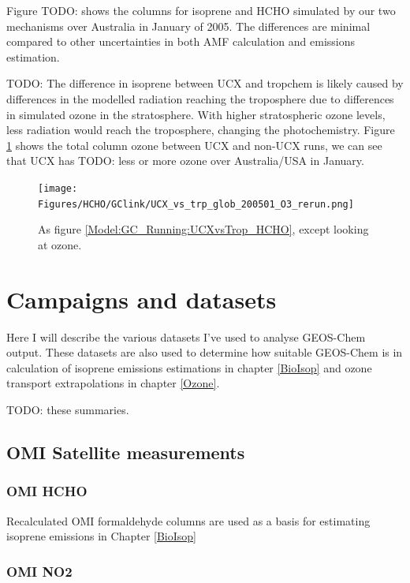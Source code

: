     
    Figure TODO: shows the columns for isoprene and HCHO simulated by our two mechanisms over Australia in January of 2005.
    The differences are minimal compared to other uncertainties in both AMF calculation and emissions estimation.
    
    
    TODO: The difference in isoprene between UCX and tropchem is likely caused by differences in the modelled radiation reaching the troposphere due to differences in simulated ozone in the stratosphere.
    With higher stratospheric ozone levels, less radiation would reach the troposphere, changing the photochemistry.
    Figure \ref{Model:GC_Running:UCXvsTrop_O3} shows the total column ozone between UCX and non-UCX runs, we can see that UCX has TODO: less or more ozone over Australia/USA in January.
        
    \begin{figure}%
      \texttt{[image: Figures/HCHO/GClink/UCX\_vs\_trp\_glob\_200501\_O3\_rerun.png]}
      \caption{%
        As figure \ref{Model:GC_Running:UCXvsTrop_HCHO}, except looking at ozone. 
      }
      \label{Model:GC_Running:UCXvsTrop_O3}
    \end{figure}

\section{Campaigns and datasets}
  \label{Model:Datasets}
  Here I will describe the various datasets I've used to analyse GEOS-Chem output.
  These datasets are also used to determine how suitable GEOS-Chem is in calculation of isoprene emissions estimations in chapter \ref{BioIsop} and ozone transport extrapolations in chapter \ref{Ozone}.
  
  TODO: these summaries.
  
  \subsection{OMI Satellite measurements}
  \label{Model:Datasets:OMI}
  
    \subsubsection{OMI HCHO}
    Recalculated OMI formaldehyde columns are used as a basis for estimating isoprene emissions in Chapter \ref{BioIsop}
  
    \subsubsection{OMI NO2}
    \label{Model:Datasets:OMNO2d}

